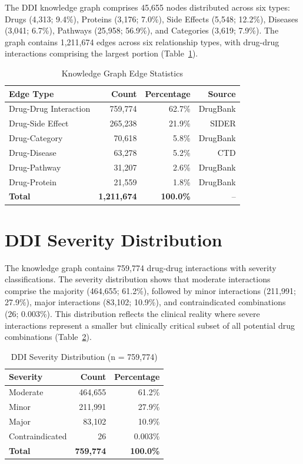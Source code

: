 \documentclass[11pt,a4paper]{article}
\begin{document}
The DDI knowledge graph comprises 45,655 nodes distributed across six types: Drugs (4,313; 9.4\%), Proteins (3,176; 7.0\%), Side Effects (5,548; 12.2\%), Diseases (3,041; 6.7\%), Pathways (25,958; 56.9\%), and Categories (3,619; 7.9\%). The graph contains 1,211,674 edges across six relationship types, with drug-drug interactions comprising the largest portion (Table~\ref{tab:kg_stats}).

\begin{table}[H]
\centering
\caption{Knowledge Graph Edge Statistics}
\label{tab:kg_stats}
\begin{tabular}{lrrr}
\toprule
\textbf{Edge Type} & \textbf{Count} & \textbf{Percentage} & \textbf{Source} \\
\midrule
Drug-Drug Interaction & 759,774 & 62.7\% & DrugBank \\
Drug-Side Effect & 265,238 & 21.9\% & SIDER \\
Drug-Category & 70,618 & 5.8\% & DrugBank \\
Drug-Disease & 63,278 & 5.2\% & CTD \\
Drug-Pathway & 31,207 & 2.6\% & DrugBank \\
Drug-Protein & 21,559 & 1.8\% & DrugBank \\
\midrule
\textbf{Total} & \textbf{1,211,674} & \textbf{100.0\%} & -- \\
\bottomrule
\end{tabular}
\end{table}

\section{DDI Severity Distribution}

The knowledge graph contains 759,774 drug-drug interactions with severity classifications. The severity distribution shows that moderate interactions comprise the majority (464,655; 61.2\%), followed by minor interactions (211,991; 27.9\%), major interactions (83,102; 10.9\%), and contraindicated combinations (26; 0.003\%). This distribution reflects the clinical reality where severe interactions represent a smaller but clinically critical subset of all potential drug combinations (Table~\ref{tab:severity_distribution}).

\begin{table}[H]
\centering
\caption{DDI Severity Distribution (n = 759,774)}
\label{tab:severity_distribution}
\begin{tabular}{lrr}
\toprule
\textbf{Severity} & \textbf{Count} & \textbf{Percentage} \\
\midrule
Moderate & 464,655 & 61.2\% \\
Minor & 211,991 & 27.9\% \\
Major & 83,102 & 10.9\% \\
Contraindicated & 26 & 0.003\% \\
\midrule
\textbf{Total} & \textbf{759,774} & \textbf{100.0\%} \\
\bottomrule
\end{tabular}
\end{table}
\end{document}
